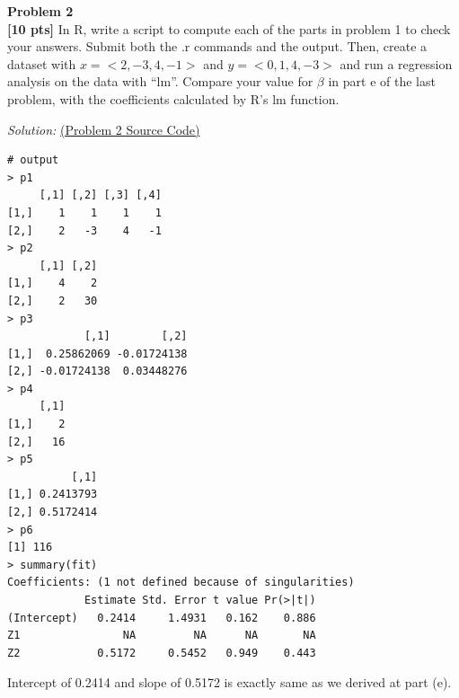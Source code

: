 \documentclass{article}
\newenvironment{problem}[2][Problem]
    { \begin{mdframed}[backgroundcolor=gray!20] \textbf{#1 #2} \\}
    {  \end{mdframed}}
\newenvironment{solution}
    {\textit{Solution:}}
    {}
\begin{document}
\newpage
\begin{problem}{2}
\textbf{[10 pts]}
In R, write a script to compute each of the parts in problem 1 to check your answers. Submit both the .r commands and the output. Then, create a dataset with $x = <2, -3, 4, -1>$ and $y = <0, 1, 4, -3>$ and run a regression analysis on the data with “lm”. Compare your value for $\beta$ in part e of the last problem, with the coefficients calculated by R's lm function.
\end{problem}
\begin{solution}
\href{run:./src/p2.r}{ (Problem 2 Source Code)}
\begin{lstlisting}
# output
> p1
     [,1] [,2] [,3] [,4]
[1,]    1    1    1    1
[2,]    2   -3    4   -1
> p2
     [,1] [,2]
[1,]    4    2
[2,]    2   30
> p3
            [,1]        [,2]
[1,]  0.25862069 -0.01724138
[2,] -0.01724138  0.03448276
> p4
     [,1]
[1,]    2
[2,]   16
> p5
          [,1]
[1,] 0.2413793
[2,] 0.5172414
> p6
[1] 116
> summary(fit)
Coefficients: (1 not defined because of singularities)
            Estimate Std. Error t value Pr(>|t|)
(Intercept)   0.2414     1.4931   0.162    0.886
Z1                NA         NA      NA       NA
Z2            0.5172     0.5452   0.949    0.443
\end{lstlisting}
Intercept of 0.2414 and slope of 0.5172 is exactly same as we derived at part (e).
\end{solution}
\end{document}
